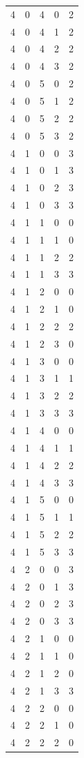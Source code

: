 \begin{longtable}{rrrrr}
4 & 0 & 4 & 0 & 2 \\
4 & 0 & 4 & 1 & 2 \\
4 & 0 & 4 & 2 & 2 \\
4 & 0 & 4 & 3 & 2 \\
4 & 0 & 5 & 0 & 2 \\
4 & 0 & 5 & 1 & 2 \\
4 & 0 & 5 & 2 & 2 \\
4 & 0 & 5 & 3 & 2 \\
4 & 1 & 0 & 0 & 3 \\
4 & 1 & 0 & 1 & 3 \\
4 & 1 & 0 & 2 & 3 \\
4 & 1 & 0 & 3 & 3 \\
4 & 1 & 1 & 0 & 0 \\
4 & 1 & 1 & 1 & 0 \\
4 & 1 & 1 & 2 & 2 \\
4 & 1 & 1 & 3 & 3 \\
4 & 1 & 2 & 0 & 0 \\
4 & 1 & 2 & 1 & 0 \\
4 & 1 & 2 & 2 & 2 \\
4 & 1 & 2 & 3 & 0 \\
4 & 1 & 3 & 0 & 0 \\
4 & 1 & 3 & 1 & 1 \\
4 & 1 & 3 & 2 & 2 \\
4 & 1 & 3 & 3 & 3 \\
4 & 1 & 4 & 0 & 0 \\
4 & 1 & 4 & 1 & 1 \\
4 & 1 & 4 & 2 & 2 \\
4 & 1 & 4 & 3 & 3 \\
4 & 1 & 5 & 0 & 0 \\
4 & 1 & 5 & 1 & 1 \\
4 & 1 & 5 & 2 & 2 \\
4 & 1 & 5 & 3 & 3 \\
4 & 2 & 0 & 0 & 3 \\
4 & 2 & 0 & 1 & 3 \\
4 & 2 & 0 & 2 & 3 \\
4 & 2 & 0 & 3 & 3 \\
4 & 2 & 1 & 0 & 0 \\
4 & 2 & 1 & 1 & 0 \\
4 & 2 & 1 & 2 & 0 \\
4 & 2 & 1 & 3 & 3 \\
4 & 2 & 2 & 0 & 0 \\
4 & 2 & 2 & 1 & 0 \\
4 & 2 & 2 & 2 & 0 \\

\end{longtable}
